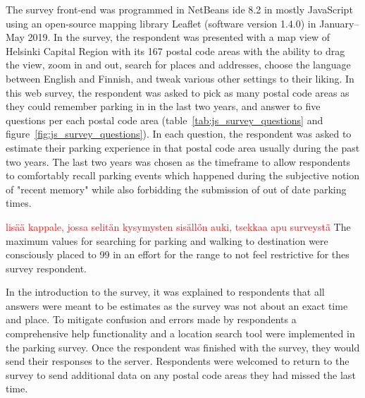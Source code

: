 The survey front-end was programmed in NetBeans \gls{ide} 8.2 in mostly JavaScript using an open-source mapping library Leaflet (software version 1.4.0) in January--May 2019. In the survey, the respondent was presented with a map view of Helsinki Capital Region with its 167 postal code areas with the ability to drag the view, zoom in and out, search for places and addresses, choose the language between English and Finnish, and tweak various other settings to their liking. In this web survey, the respondent was asked to pick as many postal code areas as they could remember parking in in the last two years, and answer to five questions per each postal code area (table~\ref{tab:js_survey_questions} and figure~\ref{fig:js_survey_questions}). In each question, the respondent was asked to estimate their parking experience in that postal code area usually during the past two years. The last two years was chosen as the timeframe to allow respondents to comfortably recall parking events which happened during the subjective notion of "recent memory" while also forbidding the submission of out of date parking times. 

\textcolor{red}{lisää kappale, jossa selitän kysymysten sisällön auki, tsekkaa apu surveystä} The maximum values for searching for parking and walking to destination were consciously placed to 99 in an effort for the range to not feel restrictive for thes survey respondent.

In the introduction to the survey, it was explained to respondents that all answers were meant to be estimates as the survey was not about an exact time and place. To mitigate confusion and errors made by respondents a comprehensive help functionality and a location search tool were implemented in the parking survey. Once the respondent was finished with the survey, they would send their responses to the server. Respondents were welcomed to return to the survey to send additional data on any postal code areas they had missed the last time.

